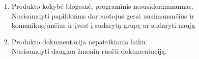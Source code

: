 \documentclass[a4paper,12pt]{article}
\begin{document}
\begin{enumerate}
	\item Produkto kokybė blogesn\. e, programinis nesusiderinamumas. \\ 
  			Nusisamdyti papildomus darbuotojus gerai nusimanan\v cius ir komunikuojan\v cius
  			ir įvest \k i sudarytą grup\k e ar sudaryti nauj\k a
  		
	\item Produkto dokumentacija nepateikiama laiku.\\
  			Nusisamdyti daugiau \v zmoni\k u ruo\v sti dokumentacij\k a.


\end{enumerate}
\end{document}
